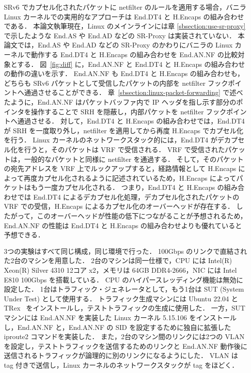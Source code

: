 SRv6 でカプセル化されたパケットに netfilter のルールを適用する場合，バニラ Linux カーネルでの実用的なアプローチは End.DT4 と H.Encaps の組み合わせである．
本論文執筆現在，Linux のメインラインには章 \ref{sbsection:use-sr-proxy} で示したような End.AS や End.AD などの SR-Proxy は実装されていない．
本論文では，End.AS や End.AD などの SR-Proxy のかわりにバニラの Linux カーネルで動作する End.DT4 と H.Encaps の組み合わせを End.AN.NF の比較対象とする．
図~\ref*{fig:diff} に，End.AN.NF と End.DT4 と H.Encaps の組み合わせの動作の違いを示す．
End.AN.NF も End.DT4 と H.Encaps の組み合わせも，どちらも SRv6 パケットとして受信したパケットの内部を netfilter フックポイントへ通過させることができる．
章~\ref{sbsection:linux-packet-forwarding} で述べたように，End.AN.NF はパケットバッファ内で IP ヘッダを指し示す部分のポインタを操作することで SRH を隠蔽し，内部パケットを netfilter フックポイントへ通過させる．
対して，End.DT4 と H.Encaps の組み合わせでは，End.DT4 が SRH を一度取り外し，netfilter を適用してから再度 H.Encaps でカプセル化を行う．
Linux カーネルのネットワークスタック的には，End.DT4 がデカプセル化を行うと，そのパケットは VRF で受信される．
VRF で受信されたパケットは，一般的なパケットと同様に netfilter を通過する．
そして，そのパケットの宛先アドレスを VRF 上でルックアップすると，経路情報として H.Encaps によって再度カプセル化されるように記述されているため，H.Encaps によってパケットはもう一度カプセル化される．
つまり，End.DT4 と H.Encaps の組み合わせでは End.DT4 によるデカプセル化処理，デカプセル化されたパケットの VRF での受信，H.Encaps によるカプセル化のオーバーヘッドが存在する．
したがって，このオーバーヘッドが性能の低下につながることが予想されるため，End.AN.NF の性能は End.DT4 と H.Encaps の組み合わせよりも優れていると予想できる．

3つの実験はすべて同じ構成，同じ環境で行った．
100Gbps のリンクで直結された2台のマシンを用意した．
2台のマシンは同一仕様で，CPU には Intel(R) Xeon(R) Silver 4310 12コア x2，メモリは 64GB DDR4-2666，NIC には Intel E810 100Gbps を搭載している．
CPU のハイパースレッディング機能は無効に設定した．
1台はトラフィック・ジェネレータとして，もう1台は SUT (System Under Test) として使用する．
トラフィック生成マシンには Ubuntu 22.04 と TRex~\cite{trex} をインストールし，テストトラフィックの生成に使用した．
一方，SUT マシンには End.AN.NF を実装した Linux カーネル 5.15.106 をインストールし，End.AN.NF と，End.AN.NF の SID を設定するために独自に拡張した iproute2 コマンドを実装した．
また，2台のマシン間のリンクには2つの VLAN を設定し，テストトラフィックを送信するためのリンクと End.AN.NF 動作後に送信されるトラフィックが論理的に別のリンクになるようにした．
VLAN は tag 付きで送信し，Linux カーネルのネットワークスタックが tag をほどく．


